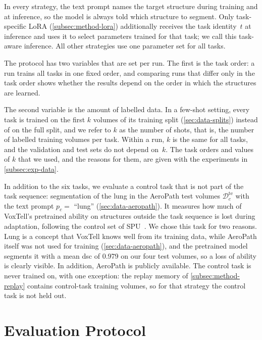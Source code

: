 In every strategy, the text prompt names the target structure during training and at inference, so the model is always told which structure to segment.
Only task-specific LoRA (\cref{subsec:method-lora}) additionally receives the task identity~$t$ at inference and uses it to select parameters trained for that task; we call this task-aware inference.
All other strategies use one parameter set for all tasks.

The protocol has two variables that are set per run.
The first is the task order: a run trains all tasks in one fixed order, and comparing runs that differ only in the task order shows whether the results depend on the order in which the structures are learned.

The second variable is the amount of labelled data.
In a few-shot setting, every task is trained on the first $k$ volumes of its training split (\cref{sec:data-splits}) instead of on the full split, and we refer to $k$ as the number of shots, that is, the number of labelled training volumes per task.
Within a run, $k$ is the same for all tasks, and the validation and test sets do not depend on~$k$.
The task orders and values of $k$ that we used, and the reasons for them, are given with the experiments in \cref{subsec:exp-data}.

In addition to the six tasks, we evaluate a control task that is not part of the task sequence: segmentation of the lung in the AeroPath test volumes $\mathcal{D}_c^{\mathrm{te}}$ with the text prompt $p_c = $ ``lung'' (\cref{sec:data-aeropath}).
It measures how much of VoxTell's pretrained ability on structures outside the task sequence is lost during adaptation, following the control set of SPU~\cite{Zhang_2024_CVPR}.
We chose this task for two reasons.
Lung is a concept that VoxTell knows well from its training data, while AeroPath itself was not used for training (\cref{sec:data-aeropath}), and the pretrained model segments it with a mean \gls{dsc} of 0.979 on our four test volumes, so a loss of ability is clearly visible.
In addition, AeroPath is publicly available.
The control task is never trained on, with one exception: the replay memory of \cref{subsec:method-replay} contains control-task training volumes, so for that strategy the control task is not held out.

\section{Evaluation Protocol}
\label{sec:method-protocol}

